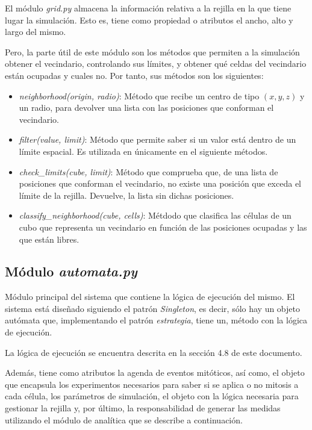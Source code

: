 El módulo \textit{grid.py} almacena la información relativa a la rejilla en la que tiene lugar
la simulación. Esto es, tiene como propiedad o atributos el ancho, alto y largo del mismo.

Pero, la parte útil de este módulo son los métodos que permiten a la simulación obtener el vecindario,
controlando sus límites, y obtener qué celdas del vecindario están ocupadas y cuales no. Por tanto,
sus métodos son los siguientes:

\begin{itemize}
  \item \textit{neighborhood(origin, radio)}: Método que recibe un centro de tipo $(x,y,z)$ y un radio, para devolver una lista con las posiciones
  que conforman el vecindario.
  \item \textit{filter(value, limit)}: Método que permite saber si un valor está dentro de un límite espacial. Es utilizada en únicamente en el siguiente métodos.
  \item \textit{check\_limits(cube, limit)}: Método que comprueba que, de una lista de posiciones que conforman el vecindario, no existe una posición que exceda el
  límite de la rejilla. Devuelve, la lista sin dichas posiciones.
  \item \textit{classify\_neighborhood(cube, cells)}: Métdodo que clasifica las células de un cubo que representa un vecindario en función de las posiciones
  ocupadas y las que están libres.
\end{itemize}

\subsection{Módulo \textit{automata.py}}

Módulo principal del sistema que contiene la lógica de ejecución del mismo. El sistema
está diseñado siguiendo el patrón \textit{Singleton}, es decir, sólo hay un objeto
autómata que, implementando el patrón \textit{estrategia}, tiene un, método con
la lógica de ejecución.

La lógica de ejecución se encuentra descrita en la sección 4.8 de este documento.

Además, tiene como atributos la agenda de eventos mitóticos, así como, el objeto que
encapsula los experimentos necesarios para saber si se aplica o no mitosis a cada célula, los
parámetros de simulación, el objeto con la lógica necesaria para gestionar la rejilla y, por último,
la responsabilidad de generar las medidas utilizando el módulo de analítica que se describe a continuación.

